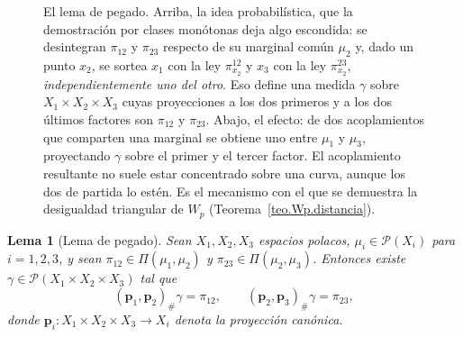 \documentclass[12pt, a4paper]{amsbook}
\newcommand{\pp}{{\mathbf p}}
\newtheorem{lema}[teo]{Lema}
\theoremstyle{remark}
\theoremstyle{definition}
\numberwithin{section}{chapter}
\numberwithin{subsection}{section}
\numberwithin{equation}{section}
\numberwithin{figure}{chapter}
\begin{document}
\begin{figure}[ht]
\caption{El lema de pegado. Arriba, la idea probabilística, que la
demostración por clases monótonas deja algo escondida: se desintegran
$\pi_{12}$ y $\pi_{23}$ respecto de su marginal común $\mu_2$ y, dado un punto
$x_2$, se sortea $x_1$ con la ley $\pi^{12}_{x_2}$ y $x_3$ con la ley
$\pi^{23}_{x_2}$, \emph{independientemente uno del otro}. Eso define una
medida $\gamma$ sobre $X_1\times X_2\times X_3$ cuyas proyecciones a los dos
primeros y a los dos últimos factores son $\pi_{12}$ y $\pi_{23}$. Abajo, el
efecto: de dos acoplamientos que comparten una marginal se obtiene uno entre
$\mu_1$ y $\mu_3$, proyectando $\gamma$ sobre el primer y el tercer factor. El
acoplamiento resultante no suele estar concentrado sobre una curva, aunque los
dos de partida lo estén. Es el mecanismo con el que se demuestra la
desigualdad triangular de $W_p$ (Teorema~\ref{teo.Wp.distancia}).}
\label{fig.pegado}
\end{figure}

\begin{lema}[Lema de pegado]\label{lema.pegado}
Sean $X_1,X_2,X_3$ espacios polacos, $\mu_i\in\mathcal P(X_i)$ para $i=1,2,3$,
y sean $\pi_{12}\in\Pi(\mu_1,\mu_2)$ y $\pi_{23}\in\Pi(\mu_2,\mu_3)$. Entonces
existe $\gamma\in\mathcal P(X_1\times X_2\times X_3)$ tal que
\[
(\pp_{1},\pp_{2})_\#\gamma=\pi_{12},
\qquad
(\pp_{2},\pp_{3})_\#\gamma=\pi_{23},
\]
donde $\pp_i\colon X_1\times X_2\times X_3\to X_i$ denota la proyección
canónica.
\end{lema}
\end{document}
